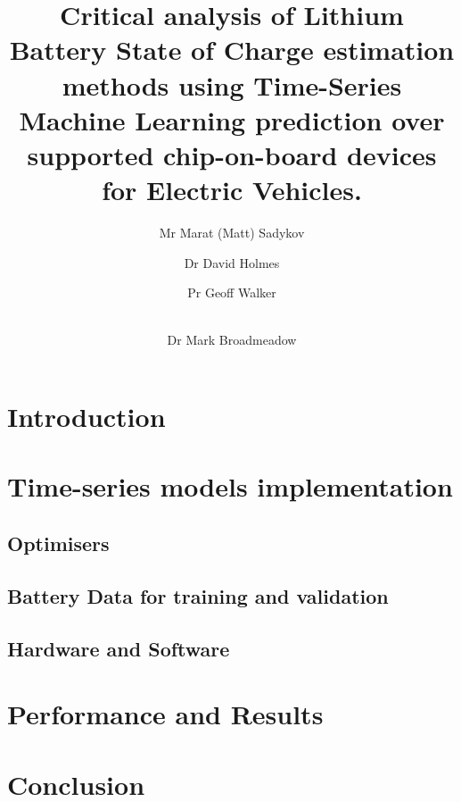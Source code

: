 \documentclass[fleqn,12pt]{olplainarticle}
\title{Critical analysis of Lithium Battery State of Charge estimation methods using Time-Series Machine Learning prediction over supported chip-on-board devices for Electric Vehicles.}
\author[1]{Mr Marat (Matt) Sadykov}
\author[2]{Dr David Holmes}
\author[3]{Pr Geoff Walker}
\author[4]{\\Dr Mark Broadmeadow}
\affil[1]{Queensland University of Technology}
\begin{document}
\flushbottom
\maketitle
\thispagestyle{empty}
\section{Introduction} \label{sec:Introduction}

\section{Time-series models implementation} \label{sec:Body}

    
    
\subsection{Optimisers} \label{subsec:optimisers}

    
    
    
\subsection{Battery Data for training and validation} \label{subsec:b_data}

\subsection{Hardware and Software} \label{subsec:soft}

\section{Performance and Results}\label{sec:results}

\section{Conclusion} \label{sec:conclussion}


\end{document}
